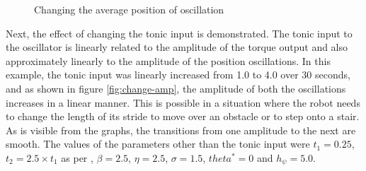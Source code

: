 \documentclass[12pt,twoside]{article}
\theoremstyle{plain}
\theoremstyle{definition}
\theoremstyle{remark}
\newcommand{\forceindent}{\leavevmode{\parindent=2em\indent}}
\begin{document}
\begin{figure}[htbp]
\centering     %
{}
\caption{Changing the average position of oscillation}
\label{fig:change-avg-pos}
\end{figure}

\forceindent Next, the effect of changing the tonic input is demonstrated. 
The tonic input to the oscillator is linearly related to the amplitude of the torque output and also approximately linearly to the amplitude of the position oscillations. In this example, the tonic input was linearly increased from 1.0 to 4.0 over 30 seconds, and as shown in figure \ref{fig:change-amp}, the amplitude of both the oscillations increases in a linear manner. This is possible in a situation where the robot needs to change the length of its stride to move over an obstacle or to step onto a stair. As is visible from the graphs, the transitions from one amplitude to the next are smooth. The values of the parameters other than the tonic input were $t_1=0.25$, $t_2= 2.5 \times t_1$ as per \cite{Ronsse2009}, $\beta=2.5$,  $\eta=2.5$, $\sigma=1.5$, $theta^*=0$ and $h_{\psi}=5.0$.
\end{document}
